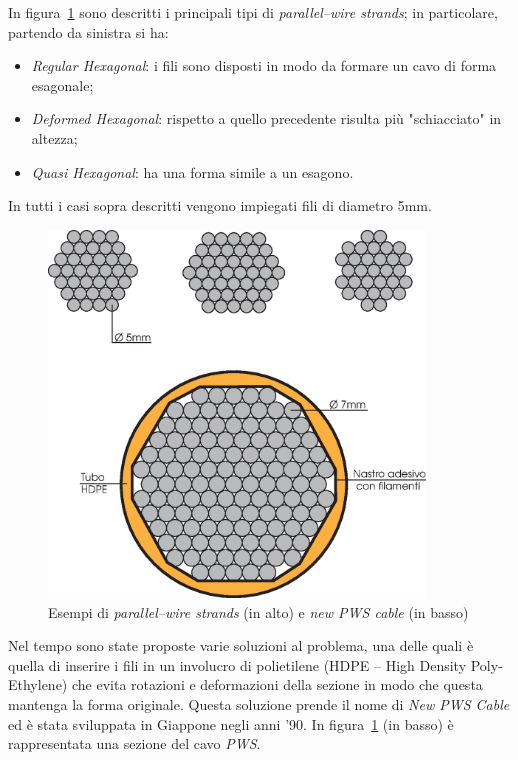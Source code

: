 In figura~\ref{fig:parallel_wire_strands} sono descritti i principali tipi di \emph{parallel--wire strands}; in particolare, partendo da sinistra si ha:
\begin{itemize}
	\item \emph{Regular Hexagonal}: i fili sono disposti in modo da formare un cavo di forma esagonale;
	\item \emph{Deformed Hexagonal}: rispetto a quello precedente risulta più "schiacciato" in altezza;
	\item \emph{Quasi Hexagonal}: ha una forma simile a un esagono.
\end{itemize}

In tutti i casi sopra descritti vengono impiegati fili di diametro \num{5}\si{mm}.

\begin{figure}
	\centering
	\includegraphics[width=10cm]{Immagini/Parallel_wire_strands}
	\caption{Esempi di \emph{parallel--wire strands} (in alto) e \emph{new PWS cable} (in basso)}
	\label{fig:parallel_wire_strands}
\end{figure}

Nel tempo sono state proposte varie soluzioni al problema, una delle quali è quella di inserire i fili in un involucro di polietilene (HDPE -- High Density Poly-Ethylene) che evita rotazioni e deformazioni della sezione in modo che questa mantenga la forma originale. Questa soluzione prende il nome di \emph{New PWS Cable} ed è stata sviluppata in Giappone negli anni '90. In figura~\ref{fig:parallel_wire_strands} (in basso) è rappresentata una sezione del cavo \textit{PWS}.
